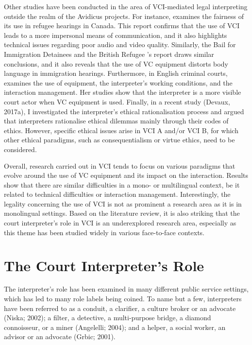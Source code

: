 \documentclass[output=paper]{langsci/langscibook}
\begin{document}
Other studies have been conducted in the area of VCI-mediated legal interpreting outside the realm of the Avidicus projects. For instance, \citet{Ellis2004} examines the fairness of its use in refugee hearings in Canada. This report confirms that the use of VCI leads to a more impersonal means of communication, and it also highlights technical issues regarding poor audio and video quality. Similarly, the Bail for Immigration Detainees and the British Refugee \citet{Council2008}’s report draws similar conclusions, and it also reveals that the use of VC equipment distorts body language in immigration hearings. Furthermore, in English criminal courts, \citet{Fowler2012} examines the use of equipment, the interpreter’s working conditions, and the interaction management. Her studies show that the interpreter is a more visible court actor when VC equipment is used. Finally, in a recent study (Devaux, 2017a), I investigated the interpreter’s ethical rationalisation process and argued that interpreters rationalise ethical dilemmas mainly through their codes of ethics. However, specific ethical issues arise in VCI A and/or VCI B, for which other ethical paradigms, such as consequentialism or virtue ethics, need to be considered. 

Overall, research carried out in VCI tends to focus on various paradigms that evolve around the use of VC equipment and its impact on the interaction. Results show that there are similar difficulties in a mono- or multilingual context, be it related to technical difficulties or interaction management. Interestingly, the legality concerning the use of VCI is not as prominent a research area as it is in monolingual settings. Based on the literature review, it is also striking that the court interpreter’s role in VCI is an underexplored research area, especially as this theme has been studied widely in various face-to-face contexts. 

\section{The Court Interpreter’s Role}
The interpreter’s role has been examined in many different public service settings, which has led to many role labels being coined. To name but a few, interpreters have been referred to as a conduit, a clarifier, a culture broker or an advocate (Niska; 2002); a filter, a detective, a multi-purpose bridge, a diamond connoisseur, or a miner (Angelelli; 2004); and a helper, a social worker, an advisor or an advocate (Grbic; 2001).
\end{document}
